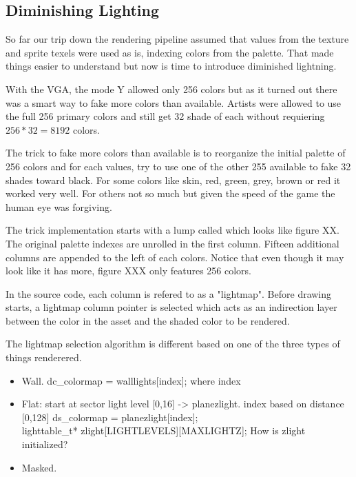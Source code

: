 \subsection{Diminishing Lighting}
\label{diminishedlightning}
\begin{figure}
\centering
{}
\end{figure}
So far our trip down the rendering pipeline assumed that values from the texture and sprite texels were used as is, indexing colors from the palette. That made things easier to understand but now is time to introduce diminished lightning.\\
\par
With the VGA, the mode Y allowed only 256 colors but as it turned out there was a smart way to fake more colors than available. Artists were allowed to use the full 256 primary colors and still get 32 shade of each without requiering $256 * 32 = 8192$ colors.\\
\par
 The trick to fake more colors than available is to reorganize the initial palette of 256 colors and for each values, try to use one of the other 255 available to fake 32 shades toward black. For some colors like skin, red, green, grey, brown or red it worked very well. For others not so much but given the speed of the game the human eye was forgiving.\\
 \par
 The trick implementation starts with a lump called  which looks like figure XX. The original palette indexes are unrolled in the first column. Fifteen additional columns are appended to the left of each colors. Notice that even though it may look like it has more, figure XXX only features 256 colors.\\
\par
In the source code, each column is refered to as a "lightmap". Before drawing starts, a lightmap column pointer is selected which acts as an indirection layer between the color in the asset and the shaded color to be rendered.\\
\par
{}
\par
The lightmap selection algorithm is different based on one of the three types of things renderered.\\
\par
\begin{itemize}
\item Wall. dc\_colormap = walllights[index]; where index 
\item Flat: start at sector light level [0,16] -> planezlight. index based on distance [0,128] ds\_colormap = planezlight[index];\\ lighttable\_t*    zlight[LIGHTLEVELS][MAXLIGHTZ]; How is zlight initialized?
\item Masked.
\end{itemize}
\par
{}
\par




